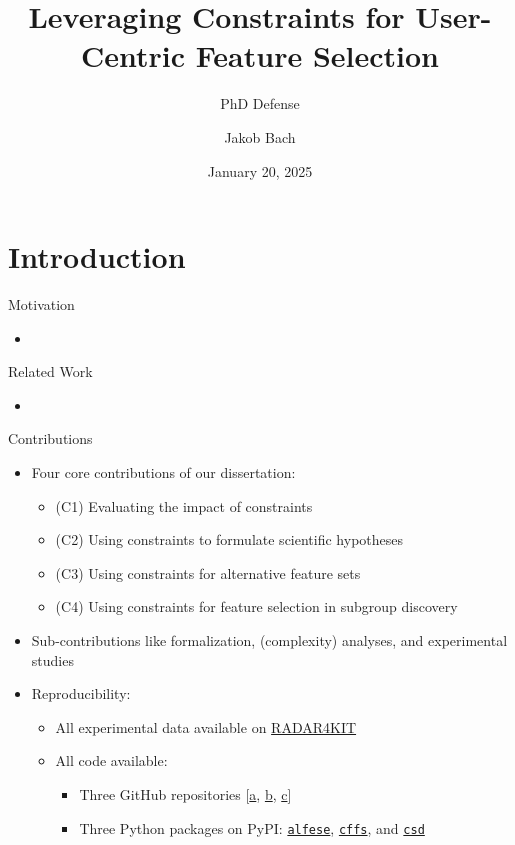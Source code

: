 \documentclass[en, navbarinline, handout]{sdqbeamer}
\title[Leveraging Constraints for User-Centric Feature Selection]{Leveraging Constraints for User-Centric Feature Selection} %
\subtitle{PhD Defense}
\author[Jakob Bach]{Jakob Bach} %
\date[2025-01-20]{January 20, 2025} %
\begin{document}
\KITtitleframe

\section{Introduction}

\begin{frame}[t]{Motivation}
	\begin{itemize}
		\item
	\end{itemize}
\end{frame}

\begin{frame}[t]{Related Work}
	\begin{itemize}
		\item
	\end{itemize}
\end{frame}

\begin{frame}[t]{Contributions}
	\label{slide:contributions}
	\begin{itemize}
		\item Four core contributions of our dissertation:
		\begin{itemize}
			\item (C1) Evaluating the impact of constraints \cite{bach2022empirical}
			\item (C2) Using constraints to formulate scientific hypotheses \cite{bach2022empirical}
			\item (C3) Using constraints for alternative feature sets \cite{bach2023finding, bach2024alternative}
			\item (C4) Using constraints for feature selection in subgroup discovery \cite{bach2025subgroup, bach2024using}
		\end{itemize}
		\item Sub-contributions like formalization, (complexity) analyses, and experimental studies
		\pause
		\vspace{\baselineskip}
		\item Reproducibility:
		\begin{itemize}
			\item All experimental data available on \href{https://doi.org/10.35097/4kjyeg0z2bxmr6eh}{RADAR4KIT}
			\item All code available:
			\begin{itemize}
				\item Three GitHub repositories [\href{https://github.com/Jakob-Bach/Constrained-Filter-Feature-Selection}{a}, \href{https://github.com/Jakob-Bach/Alternative-Feature-Selection}{b}, \href{https://github.com/Jakob-Bach/Constrained-Subgroup-Discovery}{c}]
				\item Three Python packages on PyPI: \href{https://pypi.org/project/alfese/}{\texttt{alfese}}, \href{https://pypi.org/project/cffs/}{\texttt{cffs}}, and \href{https://pypi.org/project/csd/}{\texttt{csd}}
			\end{itemize}
		\end{itemize}
	\end{itemize}
\end{frame}
\end{document}
